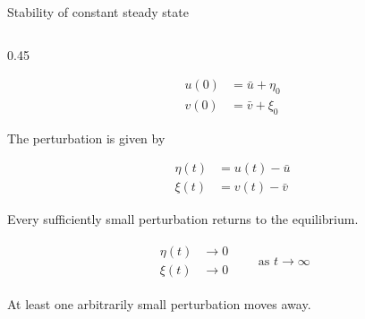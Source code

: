 \begin{frame}{Stability of constant steady state}

\vspace{-0.75cm}

\begin{columns}[c,onlytextwidth]

  \begin{column}{0.45\textwidth}

      {\color{HydraWhite}\fontsize{11.4}{14.6}\selectfont
      \begin{align*}
        u(0)&=\bar u+\eta_0
        \\
        v(0)&=\bar v+\xi_0
      \end{align*}
      }

      \vspace{-0.52cm}

      {\color{HydraMuted}\fontsize{7.8}{9.6}\selectfont
        The perturbation is given by
      \par}

      \vspace{-0.68cm}

      {\color{HydraWhite}\fontsize{11.4}{14.6}\selectfont
      \begin{align*}
        \eta(t)&=u(t)-\bar u
        \\
        \xi(t)&=v(t)-\bar v
      \end{align*}
      }

      \vspace{-0.58cm}

        {Every sufficiently small perturbation returns to the equilibrium.}

      \vspace{-0.46cm}

      {\color{HydraWhite}\fontsize{10.4}{13.2}\selectfont
      \begin{align*}
        \begin{aligned}
          \eta(t)&\longrightarrow0
          \\
          \xi(t)&\longrightarrow0
        \end{aligned}
        \qquad
        \text{as }t\longrightarrow\infty
      \end{align*}
      }

      \vspace{-0.36cm}

        {At least one arbitrarily small perturbation moves away.}


\end{column}
\end{columns}
\end{frame}
